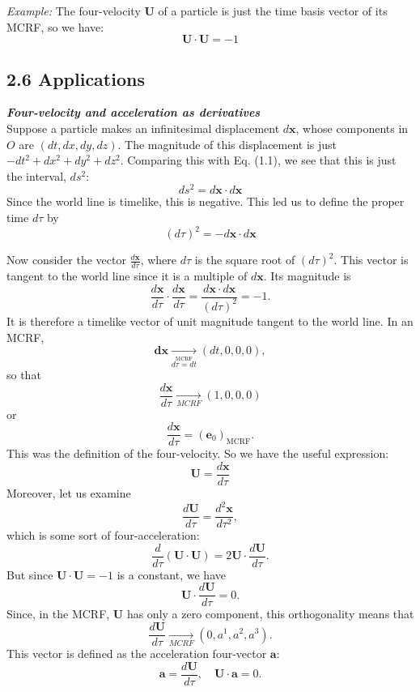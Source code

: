 \documentclass[12pt]{book}
\begin{document}
         \textit{Example:} The four-velocity \(\mathbf{U}\) of a particle is just the time basis vector of its MCRF, so we have:
        \[
            \mathbf{U}\cdot \mathbf{U} = -1
        \]
        
        
    \subsection{2.6 Applications }

    \textit{\textbf{Four-velocity and acceleration as derivatives}}\\
    
        Suppose a particle makes an infinitesimal displacement \( d\mathbf{x} \), whose components in \( O \) are \( (dt, dx, dy, dz) \). The magnitude of this displacement is just \( -dt^2 + dx^2 + dy^2 + dz^2 \). Comparing this with Eq. (1.1), we see that this is just the interval, \( ds^2 \):
        \[
        ds^2 = d\mathbf{x} \cdot d\mathbf{x}
        \]
        Since the world line is timelike, this is negative. This led us to define the proper time \( d\tau \) by
        \[
        (d\tau)^2 = -d\mathbf{x} \cdot d\mathbf{x}
        \]
        
        Now consider the vector \( \frac{d\mathbf{x}}{d\tau} \), where \( d\tau \) is the square root of \((d\tau)^2\). This vector is tangent to the world line since it is a multiple of \( d\mathbf{x} \). Its magnitude is
        \[
        \frac{d\mathbf{x}}{d\tau} \cdot \frac{d\mathbf{x}}{d\tau} = \frac{d\mathbf{x} \cdot d\mathbf{x}}{(d\tau)^2} = -1.
        \]
        It is therefore a timelike vector of unit magnitude tangent to the world line. In an MCRF,
        \[
        \mathbf{dx} \underset{\stackrel{\text{MCRF}}{\text{\(d\tau = dt\)}}}{\longrightarrow}(dt, 0, 0, 0),
        \]
        so that
        \[
        \frac{d\mathbf{x}}{d\tau} \underset{MCRF}{\longrightarrow} (1, 0, 0, 0)
        \]
        or
        \[
        \frac{d\mathbf{x}}{d\tau} = (\mathbf{e}_0)_{\text{MCRF}}.
        \]
        This was the definition of the four-velocity. So we have the useful expression:
        \[
        \mathbf{U} = \frac{d\mathbf{x}}{d\tau}
        \]
        Moreover, let us examine
        \[
        \frac{d\mathbf{U}}{d\tau} = \frac{d^2\mathbf{x}}{d\tau^2},
        \]
        which is some sort of four-acceleration:
        \[
        \frac{d}{d\tau} (\mathbf{U} \cdot \mathbf{U}) = 2\mathbf{U} \cdot \frac{d\mathbf{U}}{d\tau}.
        \]
        But since \( \mathbf{U} \cdot \mathbf{U} = -1 \) is a constant, we have
        \[
        \mathbf{U} \cdot \frac{d\mathbf{U}}{d\tau} = 0.
        \]
        Since, in the MCRF, \( \mathbf{U} \) has only a zero component, this orthogonality means that
        \[
        \frac{d\mathbf{U}}{d\tau} \underset{MCRF}{\longrightarrow} (0, a^1, a^2, a^3).
        \]
        This vector is defined as the acceleration four-vector \( \mathbf{a} \):
        \[
        \mathbf{a} = \frac{d\mathbf{U}}{d\tau}, \quad \mathbf{U} \cdot \mathbf{a} = 0.
        \]
\end{document}
